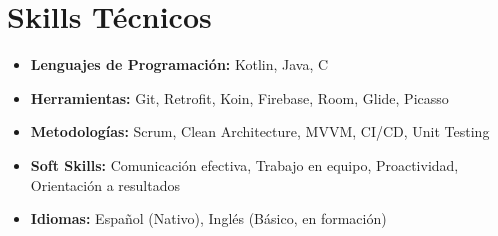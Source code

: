 \documentclass[11pt,a4paper]{article}
\begin{document}
\section{Skills Técnicos}

\begin{itemize}[leftmargin=*]
    \item \textbf{Lenguajes de Programación:} Kotlin, Java, C
    \item \textbf{Herramientas:} Git, Retrofit, Koin, Firebase, Room, Glide, Picasso
    \item \textbf{Metodologías:} Scrum, Clean Architecture, MVVM, CI/CD, Unit Testing
    \item \textbf{Soft Skills:} Comunicación efectiva, Trabajo en equipo, Proactividad, Orientación a resultados
    \item \textbf{Idiomas:} Español (Nativo), Inglés (Básico, en formación)
\end{itemize}
\end{document}
